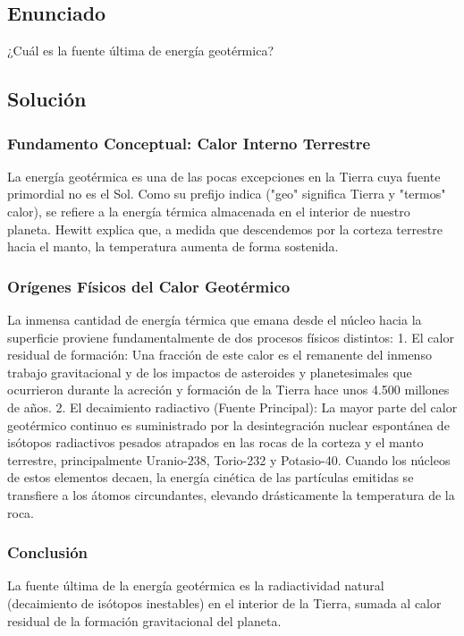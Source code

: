 \documentclass[12pt,a4paper]{article}
\begin{document}
\newpage
\subsection*{Enunciado}
¿Cuál es la fuente última de energía geotérmica?

\subsection*{Solución}

\subsubsection*{Fundamento Conceptual: Calor Interno Terrestre}
La energía geotérmica es una de las pocas excepciones en la Tierra cuya fuente primordial no es el Sol. Como su prefijo indica ("geo" significa Tierra y "termos" calor), se refiere a la energía térmica almacenada en el interior de nuestro planeta. Hewitt explica que, a medida que descendemos por la corteza terrestre hacia el manto, la temperatura aumenta de forma sostenida. 

\subsubsection*{Orígenes Físicos del Calor Geotérmico}
La inmensa cantidad de energía térmica que emana desde el núcleo hacia la superficie proviene fundamentalmente de dos procesos físicos distintos:
1. El calor residual de formación: Una fracción de este calor es el remanente del inmenso trabajo gravitacional y de los impactos de asteroides y planetesimales que ocurrieron durante la acreción y formación de la Tierra hace unos 4.500 millones de años.
2. El decaimiento radiactivo (Fuente Principal): La mayor parte del calor geotérmico continuo es suministrado por la desintegración nuclear espontánea de isótopos radiactivos pesados atrapados en las rocas de la corteza y el manto terrestre, principalmente Uranio-238, Torio-232 y Potasio-40. Cuando los núcleos de estos elementos decaen, la energía cinética de las partículas emitidas se transfiere a los átomos circundantes, elevando drásticamente la temperatura de la roca.

\subsubsection*{Conclusión}
La fuente última de la energía geotérmica es la radiactividad natural (decaimiento de isótopos inestables) en el interior de la Tierra, sumada al calor residual de la formación gravitacional del planeta.
\end{document}
